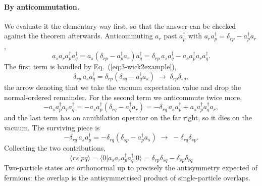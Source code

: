 \paragraph{By anticommutation.}
We evaluate it the elementary way first, so that the answer can be checked
against the theorem afterwards.  Anticommuting $a_r$ past $a_p^{\dagger}$
with $a_r a_p^{\dagger}=\delta_{rp}-a_p^{\dagger}a_r$,
\begin{equation}
  a_s a_r a_p^{\dagger}a_q^{\dagger}
   = a_s\left(\delta_{rp}-a_p^{\dagger}a_r\right)a_q^{\dagger}
   = \delta_{rp}\,a_s a_q^{\dagger} - a_s a_p^{\dagger}a_r a_q^{\dagger} .
  \label{eq:3-four1}
\end{equation}
The first term is handled by Eq.~(\ref{eq:3-wick2example}),
\begin{equation}
  \delta_{rp}\,a_s a_q^{\dagger}
   = \delta_{rp}\left(\delta_{sq}-a_q^{\dagger}a_s\right)
   \;\longrightarrow\; \delta_{rp}\delta_{sq},
  \label{eq:3-four2}
\end{equation}
the arrow denoting that we take the vacuum expectation value and drop the
normal-ordered remainder.  For the second term we anticommute twice more,
\begin{equation}
  -a_s a_p^{\dagger}a_r a_q^{\dagger}
   = -a_s a_p^{\dagger}\left(\delta_{rq}-a_q^{\dagger}a_r\right)
   = -\delta_{rq}\,a_s a_p^{\dagger} + a_s a_p^{\dagger}a_q^{\dagger}a_r ,
  \label{eq:3-four3}
\end{equation}
and the last term has an annihilation operator on the far right, so it dies on
the vacuum.  The surviving piece is
\begin{equation}
  -\delta_{rq}\,a_s a_p^{\dagger}
   = -\delta_{rq}\left(\delta_{sp}-a_p^{\dagger}a_s\right)
   \;\longrightarrow\; -\delta_{rq}\delta_{sp} .
  \label{eq:3-four4}
\end{equation}
Collecting the two contributions,
\begin{equation}
  \boxed{\;
  \langle rs\vert pq\rangle
   = \langle 0\vert a_s a_r a_p^{\dagger}a_q^{\dagger}\vert 0\rangle
   = \delta_{rp}\delta_{sq} - \delta_{sp}\delta_{rq} \;}
  \label{eq:3-fourresult}
\end{equation}
Two-particle states are orthonormal up to precisely the antisymmetry expected
of fermions: the overlap is the antisymmetrised product of single-particle
overlaps.

